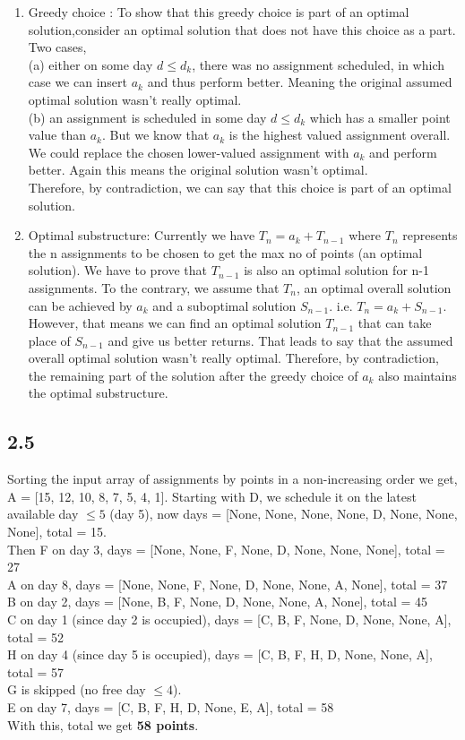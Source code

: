 \documentclass{article}[12pt]
\begin{document}
\begin{enumerate}
\item Greedy choice : To show that this greedy choice is part of an optimal solution,consider an optimal solution that does not have this choice as a part. \\ Two cases, \\
(a) either on some day $d \le d_k$, there was no assignment scheduled, in which case we can insert $a_k$ and thus perform better. Meaning the original assumed optimal solution wasn't really optimal.\\
(b) an assignment is scheduled in some day $d \le d_k$ which has a smaller point value than $a_k$. But we know that $a_k$ is the highest valued assignment overall. We could replace the chosen lower-valued assignment with $a_k$ and perform better. Again this means the original solution wasn't optimal.\\
Therefore, by contradiction, we can say that this choice is part of an optimal solution.

\item Optimal substructure:
Currently we have $T_n = a_k + T_{n-1}$ where $T_n$ represents the n assignments to be chosen to get the max no of points (an optimal solution). We have to prove that $T_{n-1}$ is also an optimal solution for n-1 assignments.
To the contrary, we assume that $T_n$, an optimal overall solution can be achieved by $a_k$ and a suboptimal solution $S_{n-1}$. i.e. $T_n = a_k + S_{n-1}$.
However, that means we can find an optimal solution $T_{n-1}$ that can take place of $S_{n-1}$ and give us better returns. That leads to say that the assumed overall optimal solution wasn't really optimal.
Therefore, by contradiction, the remaining part of the solution after the greedy choice of $a_k$ also maintains the optimal substructure.
\end{enumerate}

\subsection*{2.5} 
Sorting the input array of assignments by points in a non-increasing order we get,
A = [15, 12, 10, 8, 7, 5, 4, 1]. 
Starting with D, we schedule it on the latest available day $\le 5$ (day 5), now
days = [None, None, None, None, D, None, None, None], total = 15. \\
Then F on day 3,
days = [None, None, F, None, D, None, None, None], total = 27 \\
A on day 8,
days = [None, None, F, None, D, None, None, A, None], total = 37 \\
B on day 2,
days = [None, B, F, None, D, None, None, A, None], total = 45 \\
C on day 1 (since day 2 is occupied),
days = [C, B, F, None, D, None, None, A], total = 52\\
H on day 4 (since day 5 is occupied),
days = [C, B, F, H, D, None, None, A], total = 57 \\
G is skipped (no free day $\le 4$). \\
E on day 7,
days = [C, B, F, H, D, None, E, A], total = 58 \\
With this, total we get \textbf{58 points}.
\end{document}
